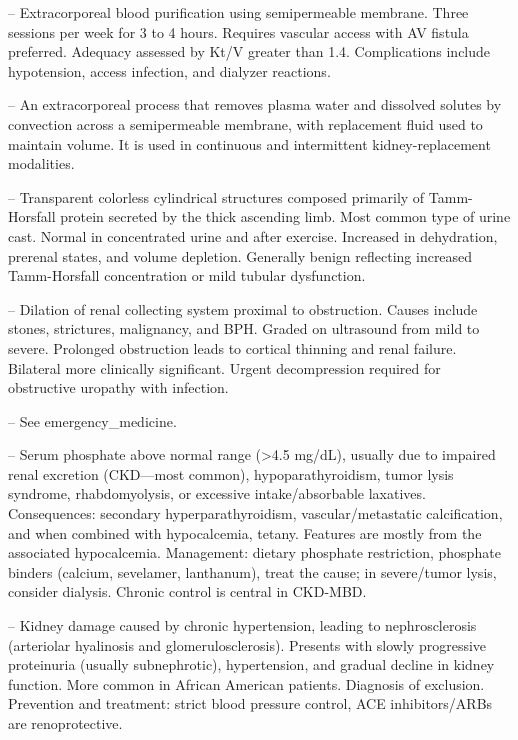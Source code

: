 -- Extracorporeal blood purification using semipermeable membrane. Three sessions per week for 3 to 4 hours. Requires vascular access with AV fistula preferred. Adequacy assessed by Kt/V greater than 1.4. Complications include hypotension, access infection, and dialyzer reactions.

-- An extracorporeal process that removes plasma water and dissolved solutes by convection across a semipermeable membrane, with replacement fluid used to maintain volume. It is used in continuous and intermittent kidney-replacement modalities.

-- Transparent colorless cylindrical structures composed primarily of Tamm-Horsfall protein secreted by the thick ascending limb. Most common type of urine cast. Normal in concentrated urine and after exercise. Increased in dehydration, prerenal states, and volume depletion. Generally benign reflecting increased Tamm-Horsfall concentration or mild tubular dysfunction.

-- Dilation of renal collecting system proximal to obstruction. Causes include stones, strictures, malignancy, and BPH. Graded on ultrasound from mild to severe. Prolonged obstruction leads to cortical thinning and renal failure. Bilateral more clinically significant. Urgent decompression required for obstructive uropathy with infection.

-- See emergency\_medicine.

-- Serum phosphate above normal range (>4.5 mg/dL), usually due to impaired renal excretion (CKD—most common), hypoparathyroidism, tumor lysis syndrome, rhabdomyolysis, or excessive intake/absorbable laxatives. Consequences: secondary hyperparathyroidism, vascular/metastatic calcification, and when combined with hypocalcemia, tetany. Features are mostly from the associated hypocalcemia. Management: dietary phosphate restriction, phosphate binders (calcium, sevelamer, lanthanum), treat the cause; in severe/tumor lysis, consider dialysis. Chronic control is central in CKD-MBD.

-- Kidney damage caused by chronic hypertension, leading to nephrosclerosis (arteriolar hyalinosis and glomerulosclerosis). Presents with slowly progressive proteinuria (usually subnephrotic), hypertension, and gradual decline in kidney function. More common in African American patients. Diagnosis of exclusion. Prevention and treatment: strict blood pressure control, ACE inhibitors/ARBs are renoprotective.

